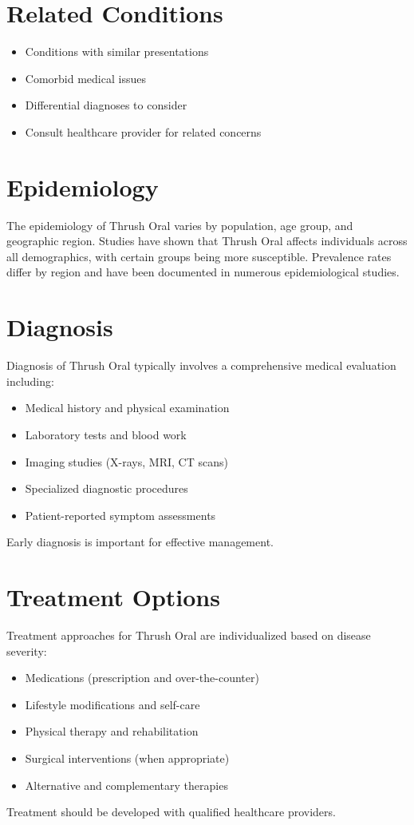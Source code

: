 \section*{Related Conditions}
\begin{itemize}
  \item Conditions with similar presentations
  \item Comorbid medical issues
  \item Differential diagnoses to consider
  \item Consult healthcare provider for related concerns
\end{itemize}

\section*{Epidemiology}
The epidemiology of Thrush Oral varies by population, age group, and geographic region. Studies have shown that Thrush Oral affects individuals across all demographics, with certain groups being more susceptible. Prevalence rates differ by region and have been documented in numerous epidemiological studies.

\section*{Diagnosis}
Diagnosis of Thrush Oral typically involves a comprehensive medical evaluation including:
\begin{itemize}
  \item Medical history and physical examination
  \item Laboratory tests and blood work
  \item Imaging studies (X-rays, MRI, CT scans)
  \item Specialized diagnostic procedures
  \item Patient-reported symptom assessments
\end{itemize}
Early diagnosis is important for effective management.

\section*{Treatment Options}
Treatment approaches for Thrush Oral are individualized based on disease severity:
\begin{itemize}
  \item Medications (prescription and over-the-counter)
  \item Lifestyle modifications and self-care
  \item Physical therapy and rehabilitation
  \item Surgical interventions (when appropriate)
  \item Alternative and complementary therapies
\end{itemize}
Treatment should be developed with qualified healthcare providers.

